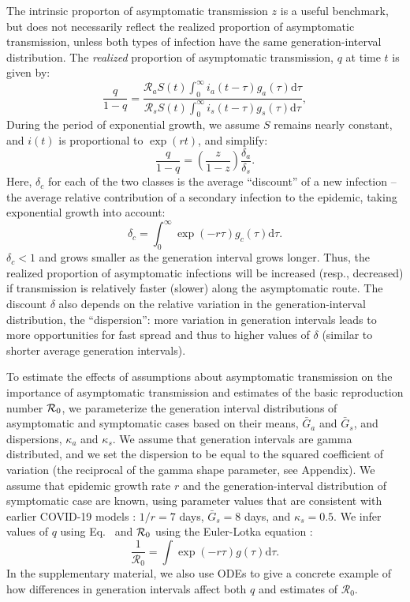 The intrinsic proporton of asymptomatic transmission $z$ is a useful benchmark, but does not necessarily reflect the realized proportion of asymptomatic transmission, unless both types of infection have the same generation-interval distribution.
The \emph{realized} proportion of asymptomatic transmission, $q$ at time $t$ is given by:
\begin{equation}
\frac{q}{1-q}=\frac{\mathcal R_a S(t) \int_0^\infty i_a(t-\tau) g_a(\tau) \mathrm{d}\tau}{\mathcal R_s S(t) \int_0^\infty i_s(t-\tau) g_s(\tau) \mathrm{d}\tau},
\end{equation}
During the period of exponential growth, we assume $S$ remains nearly constant, and $i(t)$ is proportional to $\exp(r t)$, and simplify: 
\begin{equation}
\frac{q}{1-q}=\left(\frac{z}{1-z}\right)\frac{\delta_a}{\delta_s}.
\label{eq.qratio}
\end{equation}
Here, $\delta_c$ for each of the two classes is the average ``discount'' of a new infection -- the average relative contribution of a secondary infection to the epidemic, taking exponential growth into account:
\begin{equation}
	\delta_c = \int_0^\infty \exp(-r\tau) g_c(\tau) \mathrm{d}\tau.
\end{equation}
$\delta_c<1$ and grows smaller as the generation interval grows longer.
Thus, the realized proportion of asymptomatic infections will be increased (resp., decreased) if transmission is relatively faster (slower) along the asymptomatic route.
The discount $\delta$ also depends on the relative variation in the generation-interval distribution, the ``dispersion'': more variation in generation intervals leads to more opportunities for fast spread and thus to higher values of $\delta$ (similar to shorter average generation intervals). 

To estimate the effects of assumptions about asymptomatic transmission on the importance of asymptomatic transmission and estimates of the basic reproduction number ${\cal{R}}_0$, we parameterize the generation interval distributions of asymptomatic and symptomatic cases based on their means, $\bar G_a$ and $\bar G_s$, and dispersions, $\kappa_a$ and $\kappa_s$.
We assume that generation intervals are gamma distributed, and we set the dispersion to be equal to the squared coefficient of variation (the reciprocal of the gamma shape parameter, see Appendix).
We assume that epidemic growth rate $r$ and the generation-interval distribution of symptomatic case are known, using parameter values that are consistent with earlier COVID-19 models \citep{park_preprint}: $1/r=7$ days, $\bar G_s=8$ days, and $\kappa_s=0.5$.
We infer values of $q$ using Eq.~ and ${\cal{R}}_0$ using the Euler-Lotka equation \citep{lotka1907relation}:
\begin{equation}
\frac{1}{\mathcal R_0} = \int \exp(-r \tau) g(\tau) \mathrm{d} \tau.
\end{equation}
In the supplementary material, we also use ODEs to give a concrete example of how differences in generation intervals affect both $q$ and estimates of $\mathcal R_0$.


